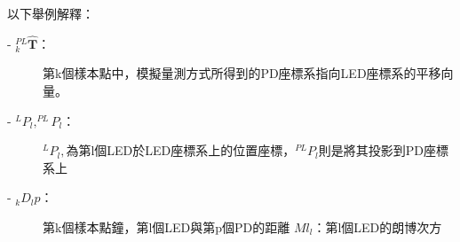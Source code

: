 以下舉例解釋：
\begin{description}
\item[- $^{PL}_{k}\hat{\boldsymbol{T}}$：]第k個樣本點中，模擬量測方式所得到的PD座標系指向LED座標系的平移向量。

\item[- $^{L}P_l,^{PL}P_l$：]$^{L}P_l,$為第l個LED於LED座標系上的位置座標，$^{PL}P_l$則是將其投影到PD座標系上

\item[- $_{k}D_lp$：]第k個樣本點鐘，第l個LED與第p個PD的距離
$Ml_l$：第l個LED的朗博次方
\end{description}